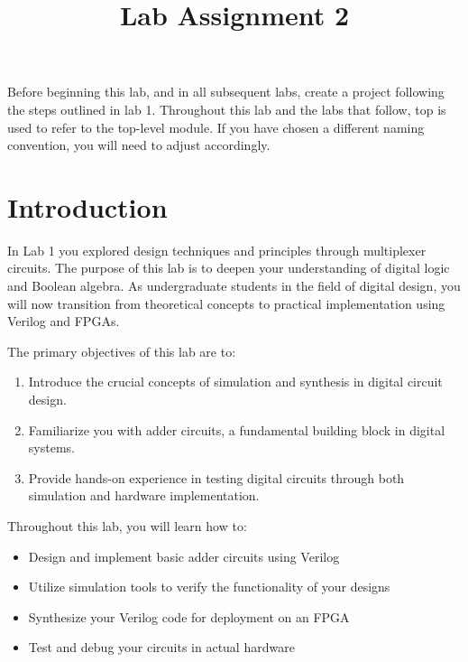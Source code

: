 \documentclass[12pt]{betterjournal}
\title{Lab Assignment 2 }
\author{}
\date{}
\newcommand{\keyword}[1]{{\usefont{OT1}{lmtt}{b}{n}#1}}
\begin{document}
\captionsetup{tablewithin=section}
\maketitle
\begin{important}[frametitle={Create a project}]
Before beginning this lab, and in all subsequent labs, create a project following the steps outlined in lab 1. Throughout this lab and the labs that follow, \keyword{top} is used to refer to the top-level module. If you have chosen a different naming convention, you will need to adjust accordingly.
\end{important}

\section{Introduction}

In Lab 1 you explored design techniques and principles through multiplexer circuits. The purpose of this lab is to deepen your understanding of digital logic and Boolean algebra. As undergraduate students in the field of digital design, you will now transition from theoretical concepts to practical implementation using Verilog and FPGAs.

The primary objectives of this lab are to:
\begin{enumerate}
    \item Introduce the crucial concepts of simulation and synthesis in digital circuit design.
    \item Familiarize you with adder circuits, a fundamental building block in digital systems.
    \item Provide hands-on experience in testing digital circuits through both simulation and hardware implementation.
\end{enumerate}



Throughout this lab, you will learn how to:

\begin{itemize}
\item Design and implement basic adder circuits using Verilog
\item Utilize simulation tools to verify the functionality of your designs
\item Synthesize your Verilog code for deployment on an FPGA
\item Test and debug your circuits in actual hardware
\end{itemize}
\end{document}
